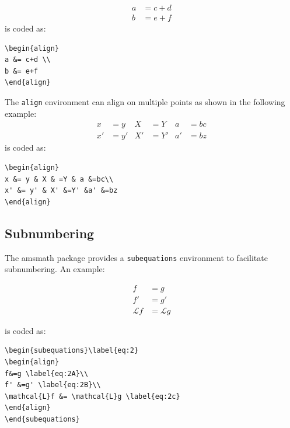 \documentclass[lettersize,journal]{IEEEtran}
\begin{document}
\begin{align}
a &= c+d \\
b &= e+f
\end{align}
\noindent is coded as:
\begin{verbatim}
\begin{align}
a &= c+d \\
b &= e+f
\end{align}
\end{verbatim}

The {\tt{align}} environment can align on multiple  points as shown in the following example:
\begin{align}
x &= y & X & =Y & a &=bc\\
x' &= y' & X' &=Y' &a' &=bz
\end{align}
\noindent is coded as:
\begin{verbatim}
\begin{align}
x &= y & X & =Y & a &=bc\\
x' &= y' & X' &=Y' &a' &=bz
\end{align}
\end{verbatim}





\subsection{Subnumbering}
\noindent The amsmath package provides a {\tt{subequations}} environment to facilitate subnumbering. An example:

\begin{subequations}\label{eq:2}
\begin{align}
f&=g \label{eq:2A}\\
f' &=g' \label{eq:2B}\\
\mathcal{L}f &= \mathcal{L}g \label{eq:2c}
\end{align}
\end{subequations}

\noindent is coded as:
\begin{verbatim}
\begin{subequations}\label{eq:2}
\begin{align}
f&=g \label{eq:2A}\\
f' &=g' \label{eq:2B}\\
\mathcal{L}f &= \mathcal{L}g \label{eq:2c}
\end{align}
\end{subequations}

\end{verbatim}
\end{document}
